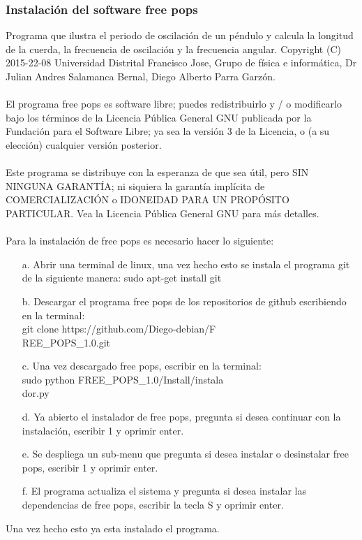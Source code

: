 \documentclass[12pt]{article}
\begin{document}
\begin{multicols}{2}
\subsubsection{Instalación del software free pops}
Programa que  ilustra el periodo de oscilación de un péndulo  y calcula la longitud de la cuerda, la frecuencia de oscilación y la frecuencia angular.   Copyright (C) 2015-22-08  Universidad Distrital Francisco Jose, Grupo de física e informática, Dr Julian Andres Salamanca Bernal, Diego Alberto Parra Garzón.
\\ \\ 
El programa free pops es software libre; puedes redistribuirlo y / o modificarlo bajo los términos de la Licencia Pública General GNU publicada por la Fundación para el Software Libre; ya sea la versión 3 de la Licencia, o (a su elección) cualquier versión posterior. 
\\ \\ 
Este programa se distribuye con la esperanza de que sea útil, pero SIN NINGUNA GARANTÍA; ni siquiera la garantía implícita de COMERCIALIZACIÓN o IDONEIDAD PARA UN PROPÓSITO PARTICULAR. Vea la Licencia Pública General GNU para más detalles. 
\\ \\
Para la instalación de free pops es necesario hacer lo siguiente:
\begin{enumerate}
\item[a. ] Abrir una terminal de linux, una vez hecho esto se instala el programa git de la siguiente manera: sudo apt-get install git 
\item[b. ] Descargar el programa free pops de los repositorios de github escribiendo en la terminal: \\git clone https://github.com/Diego-debian/F\\REE\_POPS\_1.0.git 
\item[c. ] Una vez descargado free pops, escribir en la terminal:\\sudo python FREE\_POPS\_1.0/Install/instala\\dor.py 
\item[d. ] Ya abierto el instalador de free pops, pregunta si desea continuar con la instalación, escribir 1 y oprimir enter.
\item[e. ] Se despliega un sub-menu que pregunta si desea instalar o desinstalar free pops, escribir 1 y oprimir enter.
\item[f. ] El programa actualiza el sistema y pregunta si desea instalar las dependencias de free pops, escribir la tecla S y oprimir enter. 
\end{enumerate}
Una vez hecho esto ya esta instalado el programa. 


\end{multicols}
\end{document}
